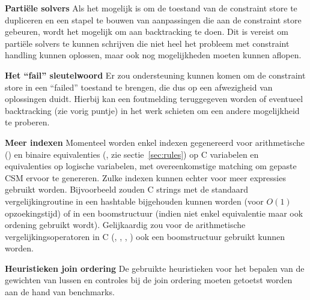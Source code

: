 {\bf Parti\"ele solvers} Als het mogelijk is om de toestand van de constraint store te dupliceren en een stapel te bouwen van aanpassingen die aan de constraint store gebeuren, wordt het mogelijk om aan backtracking te doen. Dit is vereist om parti\"ele solvers te kunnen schrijven die niet heel het probleem met constraint handling kunnen oplossen, maar ook nog mogelijkheden moeten kunnen aflopen.

{\bf Het ``fail'' sleutelwoord} Er zou ondersteuning kunnen komen om de constraint store in een ``failed'' toestand te brengen, die dus op een afwezigheid van oplossingen duidt. Hierbij kan een foutmelding teruggegeven worden of eventueel backtracking (zie vorig puntje) in het werk schieten om een andere mogelijkheid te proberen.

{\bf Meer indexen} Momenteel worden enkel indexen gegenereerd voor arithmetische (\code{==}) en binaire equivalenties (, zie sectie~\ref{sec:rules}) op C variabelen en equivalenties op logische variabelen, met overeenkomstige matching om gepaste CSM ervoor te genereren. Zulke indexen kunnen echter voor meer expressies gebruikt worden. Bijvoorbeeld zouden C strings met de standaard vergelijkingroutine  in een hashtable bijgehouden kunnen worden (voor $O(1)$ opzoekingstijd) of in een boomstructuur (indien niet enkel equivalentie maar ook ordening gebruikt wordt). Gelijkaardig zou voor de arithmetische vergelijkingsoperatoren in C (\code{>}, \code{<}, \code{>=}, \code{<=}) ook een boomstructuur gebruikt kunnen worden.

{\bf Heuristieken join ordering} De gebruikte heuristieken voor het bepalen van de gewichten van lussen en controles bij de join ordering moeten getoetst worden aan de hand van benchmarks.
